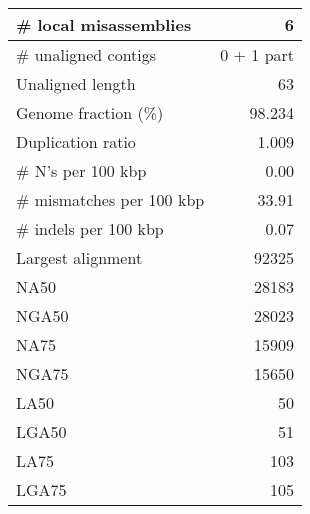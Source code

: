 \documentclass[12pt,a4paper]{article}
\begin{document}
\begin{table}[ht]
\begin{center}
\begin{tabular}{|l*{1}{|r}|}
\# local misassemblies & 6 \\ \hline
\# unaligned contigs & 0 + 1 part \\ \hline
Unaligned length & 63 \\ \hline
Genome fraction (\%) & 98.234 \\ \hline
Duplication ratio & 1.009 \\ \hline
\# N's per 100 kbp & 0.00 \\ \hline
\# mismatches per 100 kbp & 33.91 \\ \hline
\# indels per 100 kbp & 0.07 \\ \hline
Largest alignment & 92325 \\ \hline
NA50 & 28183 \\ \hline
NGA50 & 28023 \\ \hline
NA75 & 15909 \\ \hline
NGA75 & 15650 \\ \hline
LA50 & 50 \\ \hline
LGA50 & 51 \\ \hline
LA75 & 103 \\ \hline
LGA75 & 105 \\ \hline
\end{tabular}
\end{center}
\end{table}
\end{document}
